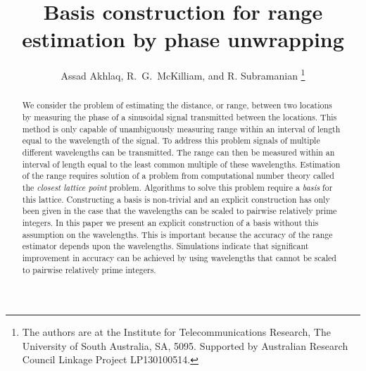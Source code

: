 \documentclass[10pt,twocolumn,twoside]{IEEEtran}
\title{Basis construction for range estimation by phase unwrapping}
\author{Assad Akhlaq, R.~G.~McKilliam, and R. Subramanian 
\thanks{The authors are at the Institute for Telecommunications Research, The University of South Australia, SA, 5095.  Supported by Australian Research Council Linkage Project LP130100514.}
}
\begin{document}
% 
\maketitle


%
\begin{abstract}


We consider the problem of estimating the distance, or range, between two locations by measuring the phase of a sinusoidal signal transmitted between the locations. This method is only capable of unambiguously measuring range within an interval of length equal to the wavelength of the signal. To address this problem signals of multiple different wavelengths can be transmitted.  The range can then be measured within an interval of length equal to the least common multiple of these wavelengths.  Estimation of the range requires solution of a problem from computational number theory called the \emph{closest lattice point} problem.  Algorithms to solve this problem require a \emph{basis} for this lattice.  Constructing a basis is non-trivial and an explicit construction has only been given in the case that the wavelengths can be scaled to pairwise relatively prime integers.  In this paper we present an explicit construction of a basis without this assumption on the wavelengths.  This is important because the accuracy of the range estimator depends upon the wavelengths.  Simulations indicate that significant improvement in accuracy can be achieved by using wavelengths that cannot be scaled to pairwise relatively prime integers.



\end{abstract}
\end{document}
